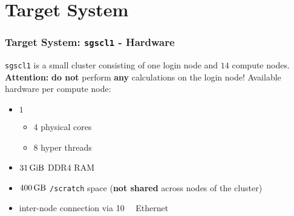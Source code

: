 \section{Target System}
\begin{frame}
  \frametitle{Target System: \texttt{sgscl1} - Hardware}
  \texttt{sgscl1} is a small cluster consisting of one login node and $\num{14}$ compute nodes. \\
  \textbf{Attention:} \textbf{do not} perform \textbf{any} calculations on the login node!
  \vfill
  Available hardware per compute node:
  \begin{itemize}
      \item $\num{1}$ 
      \begin{itemize}
          \item $\num{4}$ physical cores
          \item $\num{8}$ hyper threads
      \end{itemize}
      \item $\SI{31}{\gibi\byte}$ DDR4 RAM
      \item $\SI{400}{\giga\byte}$ \texttt{/scratch} space (\textbf{not shared} across nodes of the cluster)\\
      \item inter-node connection via \SI{10}{\giga\byte} Ethernet
  \end{itemize}
\end{frame}

